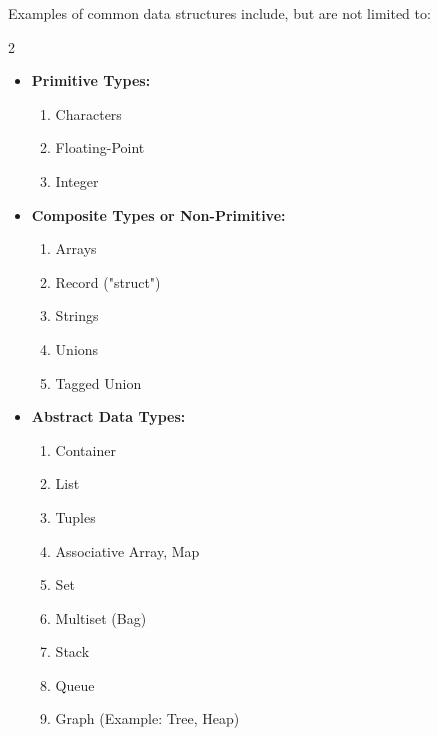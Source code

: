 \documentclass[10pt]{article}
\begin{document}
Examples of common data structures include, but are not limited to:

\begin{multicols}{2}
    \begin{itemize}[label=\textemdash, noitemsep]

        \item [] \textbf{Primitive Types:}
        \begin{enumerate}[label=\arabic*., noitemsep]
            \item Characters  
            \item Floating-Point
            \item Integer
        \end{enumerate}

        \vspace{4pt}
        \item [] \textbf{Composite Types or Non-Primitive:}
        \begin{enumerate}[label=\arabic*., noitemsep]
            \item Arrays
            \item Record ("struct")
            \item Strings 
            \item Unions 
            \item Tagged Union
        \end{enumerate}

        \columnbreak
        
        \item [] \textbf{Abstract Data Types:}
        \begin{enumerate}[label=\arabic*., noitemsep]
            \item Container 
            \item List
            \item Tuples
            \item Associative Array, Map 
            \item Set
            \item Multiset (Bag) 
            \item Stack 
            \item Queue
            \item Graph (Example: Tree, Heap)
        \end{enumerate}

    \end{itemize}
\end{multicols}  
\end{document}
